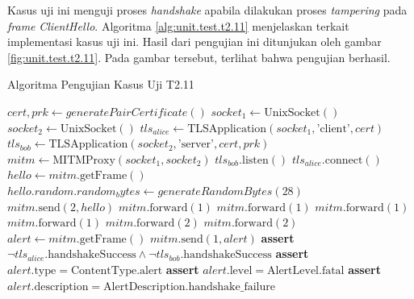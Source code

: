 Kasus uji ini menguji proses \emph{handshake} apabila dilakukan proses \emph{tampering} pada \emph{frame} \emph{ClientHello}. Algoritma \ref{alg:unit.test.t2.11} menjelaskan terkait implementasi kasus uji ini. Hasil dari pengujian ini ditunjukan oleh gambar \ref{fig:unit.test.t2.11}. Pada gambar tersebut, terlihat bahwa pengujian berhasil.

\begin{algorithm}
  \caption{Algoritma Pengujian Kasus Uji T2.11}
  \label{alg:unit.test.t2.11}
  \begin{algorithmic}
    \State $cert, prk \gets generatePairCertificate()$
    \State $socket_1 \gets \text{UnixSocket}()$
    \State $socket_2 \gets \text{UnixSocket}()$
    \State $tls_{alice} \gets \text{TLSApplication}(socket_1, \text{'client'}, cert)$ 
    \State $tls_{bob} \gets \text{TLSApplication}(socket_2, \text{'server'}, cert, prk)$
    \State $mitm \gets \text{MITMProxy}(socket_1, socket_2)$
    \State
    \State $tls_{bob}.\text{listen}()$  
    \State $tls_{alice}.\text{connect}()$  
    \State
    \State $hello \gets mitm.\text{getFrame}()$ 
    \State $hello.random.random_bytes \gets generateRandomBytes(28)$
    \State $mitm.\text{send}(2, hello)$
    \State
    \State $mitm.\text{forward}(1)$ 
    \State $mitm.\text{forward}(1)$ 
    \State $mitm.\text{forward}(1)$ 
    \State $mitm.\text{forward}(1)$ 
    \State $mitm.\text{forward}(2)$ 
    \State $mitm.\text{forward}(2)$ 
    \State
    \State $alert \gets mitm.\text{getFrame}()$
    \State $mitm.\text{send}(1, alert)$
    \State
    \State \textbf{assert} $\lnot tls_{alice}.\text{handshakeSuccess} \land \lnot tls_{bob}.\text{handshakeSuccess}$
    \State \textbf{assert} $alert.\text{type} = \text{ContentType.alert}$
    \State \textbf{assert} $alert.\text{level} = \text{AlertLevel.fatal}$
    \State \textbf{assert} $alert.\text{description} = \text{AlertDescription.handshake\_failure}$
  \end{algorithmic}
\end{algorithm}

